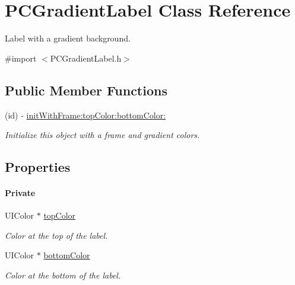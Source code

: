 \hypertarget{interface_p_c_gradient_label}{
\section{PCGradientLabel Class Reference}
\label{interface_p_c_gradient_label}
}


Label with a gradient background.  




{\ttfamily \#import $<$PCGradientLabel.h$>$}

\subsection*{Public Member Functions}
\begin{DoxyCompactItemize}
\item 
\hypertarget{interface_p_c_gradient_label_ade2836a06349191ba9ae62b7f708b339}{
(id) -\/ \hyperlink{interface_p_c_gradient_label_ade2836a06349191ba9ae62b7f708b339}{initWithFrame:topColor:bottomColor:}}
\label{interface_p_c_gradient_label_ade2836a06349191ba9ae62b7f708b339}

\begin{DoxyCompactList}\small\item\em Initialize this object with a frame and gradient colors. \end{DoxyCompactList}\end{DoxyCompactItemize}
\subsection*{Properties}
\begin{Indent}\paragraph*{Private}
\begin{DoxyCompactItemize}
\item 
\hypertarget{interface_p_c_gradient_label_aa93fdc207621b56ed3e448d6db135ee3}{
UIColor $\ast$ \hyperlink{interface_p_c_gradient_label_aa93fdc207621b56ed3e448d6db135ee3}{topColor}}
\label{interface_p_c_gradient_label_aa93fdc207621b56ed3e448d6db135ee3}

\begin{DoxyCompactList}\small\item\em Color at the top of the label. \end{DoxyCompactList}\item 
\hypertarget{interface_p_c_gradient_label_a5afa876e1d9ebc653bed6fbc6920eebe}{
UIColor $\ast$ \hyperlink{interface_p_c_gradient_label_a5afa876e1d9ebc653bed6fbc6920eebe}{bottomColor}}
\label{interface_p_c_gradient_label_a5afa876e1d9ebc653bed6fbc6920eebe}

\begin{DoxyCompactList}\small\item\em Color at the bottom of the label. \end{DoxyCompactList}\end{DoxyCompactItemize}
\end{Indent}


